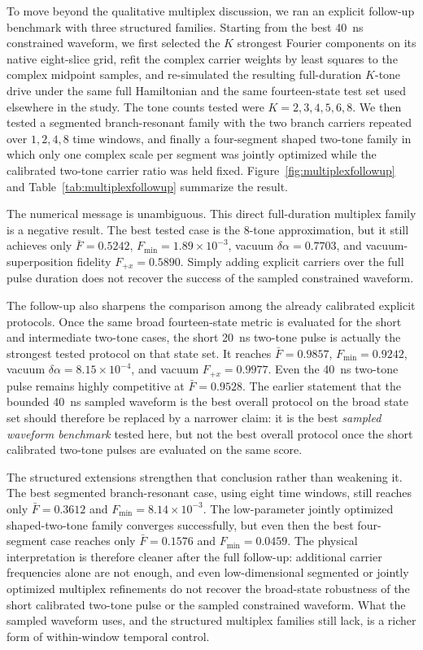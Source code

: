 \documentclass[aps,pra,twocolumn,reprint,floatfix,amsmath,amssymb]{revtex4-2}
\begin{document}
To move beyond the qualitative multiplex discussion, we ran an explicit follow-up benchmark with three structured families. Starting from the best \SI{40}{\nano\second} constrained waveform, we first selected the \(K\) strongest Fourier components on its native eight-slice grid, refit the complex carrier weights by least squares to the complex midpoint samples, and re-simulated the resulting full-duration \(K\)-tone drive under the same full Hamiltonian and the same fourteen-state test set used elsewhere in the study. The tone counts tested were \(K = 2, 3, 4, 5, 6, 8\). We then tested a segmented branch-resonant family with the two branch carriers repeated over \(1, 2, 4, 8\) time windows, and finally a four-segment shaped two-tone family in which only one complex scale per segment was jointly optimized while the calibrated two-tone carrier ratio was held fixed. Figure~\ref{fig:multiplexfollowup} and Table~\ref{tab:multiplexfollowup} summarize the result.

The numerical message is unambiguous. This direct full-duration multiplex family is a negative result. The best tested case is the \(8\)-tone approximation, but it still achieves only \(\bar{F}=0.5242\), \(F_{\min}=1.89\times 10^{-3}\), vacuum \(\delta\alpha = 0.7703\), and vacuum-superposition fidelity \(F_{+x}=0.5890\). Simply adding explicit carriers over the full pulse duration does not recover the success of the sampled constrained waveform.

The follow-up also sharpens the comparison among the already calibrated explicit protocols. Once the same broad fourteen-state metric is evaluated for the short and intermediate two-tone cases, the short \SI{20}{\nano\second} two-tone pulse is actually the strongest tested protocol on that state set. It reaches \(\bar{F}=0.9857\), \(F_{\min}=0.9242\), vacuum \(\delta\alpha = 8.15\times10^{-4}\), and vacuum \(F_{+x}=0.9977\). Even the \SI{40}{\nano\second} two-tone pulse remains highly competitive at \(\bar{F}=0.9528\). The earlier statement that the bounded \SI{40}{\nano\second} sampled waveform is the best overall protocol on the broad state set should therefore be replaced by a narrower claim: it is the best \emph{sampled waveform benchmark} tested here, but not the best overall protocol once the short calibrated two-tone pulses are evaluated on the same score.

The structured extensions strengthen that conclusion rather than weakening it. The best segmented branch-resonant case, using eight time windows, still reaches only \(\bar{F}=0.3612\) and \(F_{\min}=8.14\times 10^{-3}\). The low-parameter jointly optimized shaped-two-tone family converges successfully, but even then the best four-segment case reaches only \(\bar{F}=0.1576\) and \(F_{\min}=0.0459\). The physical interpretation is therefore cleaner after the full follow-up: additional carrier frequencies alone are not enough, and even low-dimensional segmented or jointly optimized multiplex refinements do not recover the broad-state robustness of the short calibrated two-tone pulse or the sampled constrained waveform. What the sampled waveform uses, and the structured multiplex families still lack, is a richer form of within-window temporal control.
\end{document}

